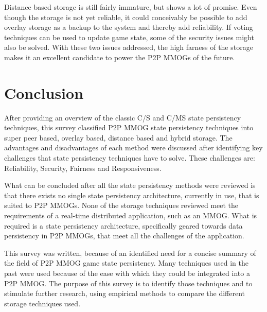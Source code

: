 \documentclass[10pt,a4paper,journal,cspaper,compsoc]{IEEEtran}
\begin{document}
Distance based storage is still fairly immature, but shows a lot of promise. Even though the storage is not yet reliable, it could conceivably be
possible to add overlay storage as a backup to the system and thereby add reliability. If voting techniques can be used to update game state, some of
the security issues might also be solved. With these two issues addressed, the high farness of the storage makes it an excellent candidate to power
the P2P MMOGs of the future.

\section{Conclusion}

After providing an overview of the classic C/S and C/MS state persistency techniques, this survey classified P2P MMOG state persistency techniques
into super peer based, overlay based, distance based and hybrid storage. The advantages and disadvantages of each method were discussed after
identifying key challenges that state persistency techniques have to solve. These challenges are: Reliability, Security, Fairness and Responsiveness.

What can be concluded after all the state persistency methods were reviewed is that there exists no single state persistency architecture, currently
in use, that is suited to P2P MMOGs. None of the storage techniques reviewed meet the requirements of a real-time distributed application, such as an
MMOG. What is required is a state persistency architecture, specifically geared towards data persistency in P2P MMOGs, that meet all the challenges
of the application.

This survey was written, because of an identified need for a concise summary of the field of P2P MMOG game state persistency. Many techniques used in
the past were used because of the ease with which they could be integrated into a P2P MMOG. The purpose of this survey is to identify those
techniques and to stimulate further research, using empirical methods to compare the different storage techniques used.





\end{document}
